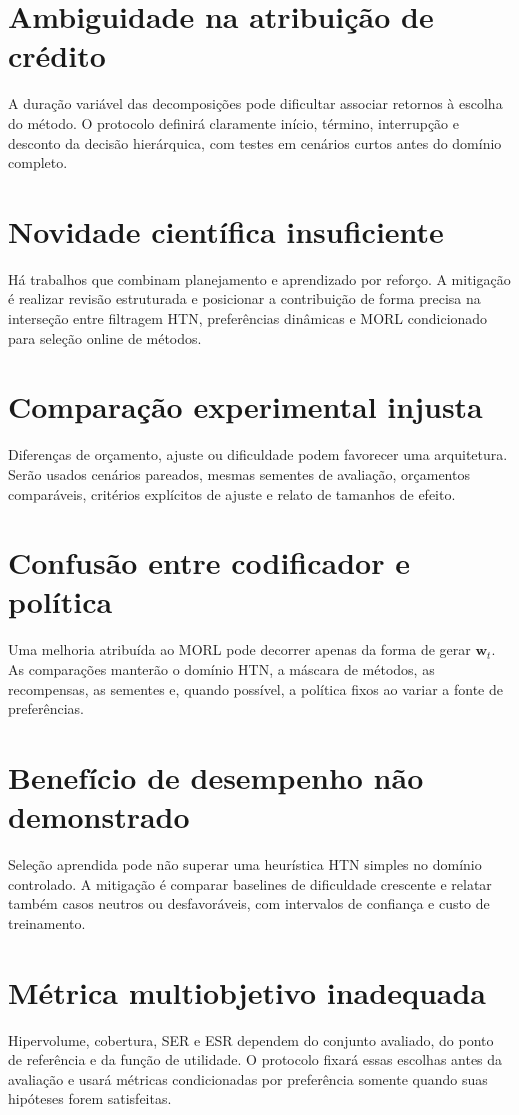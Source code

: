 \section{Ambiguidade na atribuição de crédito}

A duração variável das decomposições pode dificultar associar retornos à
escolha do método.
O protocolo definirá claramente início, término, interrupção e desconto da
decisão hierárquica, com testes em cenários curtos antes do domínio completo.

\section{Novidade científica insuficiente}

Há trabalhos que combinam planejamento e aprendizado por reforço.
A mitigação é realizar revisão estruturada e posicionar a contribuição de
forma precisa na interseção entre filtragem HTN, preferências dinâmicas e
MORL condicionado para seleção online de métodos.

\section{Comparação experimental injusta}

Diferenças de orçamento, ajuste ou dificuldade podem favorecer uma
arquitetura.
Serão usados cenários pareados, mesmas sementes de avaliação, orçamentos
comparáveis, critérios explícitos de ajuste e relato de tamanhos de efeito.

\section{Confusão entre codificador e política}

Uma melhoria atribuída ao MORL pode decorrer apenas da forma de gerar
$\mathbf{w}_t$.
As comparações manterão o domínio HTN, a máscara de métodos, as recompensas,
as sementes e, quando possível, a política fixos ao variar a fonte de
preferências.

\section{Benefício de desempenho não demonstrado}

Seleção aprendida pode não superar uma heurística HTN simples no domínio
controlado.
A mitigação é comparar baselines de dificuldade crescente e relatar também
casos neutros ou desfavoráveis, com intervalos de confiança e custo de
treinamento.

\section{Métrica multiobjetivo inadequada}

Hipervolume, cobertura, SER e ESR dependem do conjunto avaliado, do ponto de
referência e da função de utilidade.
O protocolo fixará essas escolhas antes da avaliação e usará métricas
condicionadas por preferência somente quando suas hipóteses forem satisfeitas.
